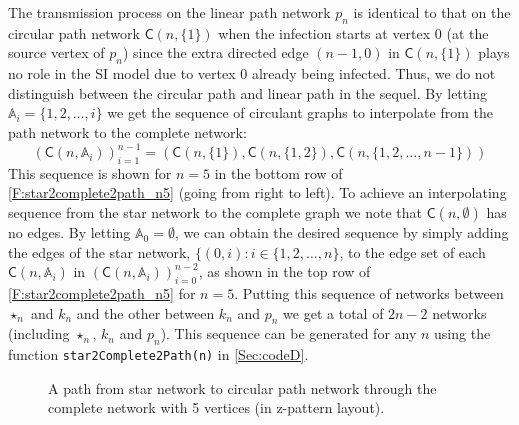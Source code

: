 \documentclass[review]{elsarticle}
\numberwithin{equation}{section}
\let\orgautoref\autoref
\renewcommand{\autoref}
        {\def\equationautorefname{Eq.}%
         \def\figureautorefname{Fig.}%
         \def\subfigureautorefname{Fig.}%
         \def\sectionautorefname{Sect.}%
         \def\subsectionautorefname{Sect.}%
         \def\subsubsectionautorefname{Sect.}%
         \def\Itemautorefname{item}%
         \def\tableautorefname{Table}%
         \def\propositionautorefname{Prop.}%
         \def\corollaryautorefname{Corollary}%
         \def\theoremautorefname{Theorem}%
         \def\remarkautorefname{Remark}%
         \def\lemmaautorefname{Lemma}%
         \def\proofofautorefname{Proof}%
         \def\exampleautorefname{Example}%
         \orgautoref}
\begin{document}
The transmission process on the linear path network $p_n$ is identical to that on the circular path network $\mathsf{C}(n,\{1\})$ when the infection starts at vertex $0$ (at the source vertex of $p_n$) since the extra directed edge $(n-1,0)$ in $\mathsf{C}(n,\{1\})$ plays no role in the SI model due to vertex $0$ already being infected. 
Thus, we do not distinguish between the circular path and linear path in the sequel.
By letting $\mathbb{A}_i=\{1,2,\ldots,i\}$ we get the sequence of circulant graphs to interpolate from the path network to the complete network:
$$\left( \mathsf{C}(n,\mathbb{A}_i) \right)_{i=1}^{n-1} = \left( \mathsf{C}(n,\{1\}), \mathsf{C}(n,\{1,2\}), \mathsf{C}(n,\{1,2,\ldots,n-1\}) \right)$$
This sequence is shown for $n=5$ in the bottom row of \autoref{F:star2complete2path_n5} (going from right to left).  
To achieve an interpolating sequence from the star network to the complete graph we
note that $\mathsf{C}(n,\emptyset)$ has no edges.
By letting $\mathbb{A}_0=\emptyset$, we can obtain the desired sequence by simply adding the 
edges of the star network, $\{(0,i): i \in \{1,2,\ldots,n\}$, to the edge set of 
each $\mathsf{C}(n,\mathbb{A}_i)$ in $\left( \mathsf{C}(n,\mathbb{A}_i) \right)_{i=0}^{n-2}$, 
as shown in the top row of \autoref{F:star2complete2path_n5} for $n=5$.
Putting this sequence of networks between $\star_n$ and $k_n$ and the other between $k_n$ and $p_n$ we get a total of $2n-2$ networks (including $\star_n$, $k_n$ and $p_n$).  
This sequence can be generated for any $n$ using the function {\tt star2Complete2Path(n)} in 
\autoref{Sec:codeD}.

\begin{figure}[htbp]
\begin{center}
{\scalebox{1.1}{

}}
\end{center}
\caption{A path from star network to circular path network through the complete network with 5 vertices (in z-pattern layout).\label{F:star2complete2path_n5}}
\end{figure}
\end{document}
